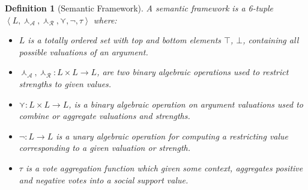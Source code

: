 \documentclass{article}
\newtheorem{definition}{Definition}
\newcommand{\args}{\mathcal{A}} %
\newcommand{\att}{\mathcal{R}}  %
\newcommand{\valueset}{L}
\newcommand{\sembodyNew}{\left\langle \valueset,\SAFand_\mathcal{A}, \SAFand_\mathcal{R},\SAFor,\lnot,\tau \right\rangle} %
\newcommand{\SAFand}{\curlywedge}     %
\newcommand{\SAFor}{\curlyvee}        %
\begin{document}
\begin{definition}[Semantic Framework]
\label{def:semfram}
A semantic framework is a 6-tuple \\$\sembodyNew$ where:

\begin{itemize}
  \item $\valueset$ is a totally ordered set with top and bottom elements $\top$, 
$\bot$, containing all possible valuations of an argument. 

  \item $\SAFand_\args,\SAFand_\att:\valueset\times \valueset\rightarrow \valueset$, are two binary algebraic operations used to restrict strengths to given values.
  
  \item $\SAFor:\valueset\times \valueset\rightarrow \valueset$, is a binary algebraic operation on argument valuations used to combine or aggregate valuations and strengths.
  
  \item $\lnot:\valueset\rightarrow \valueset$ is a unary algebraic operation for computing a restricting value corresponding to a given valuation or strength.
  
  \item $\tau$ is a vote aggregation function which given some context, aggregates positive and negative votes into a social support value.

\end{itemize}
\end{definition}
\end{document}
